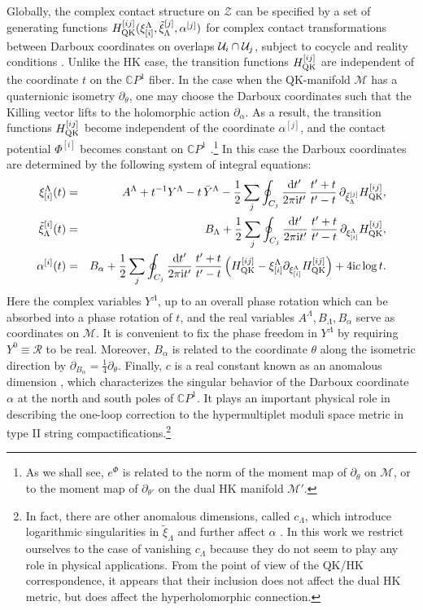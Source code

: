 \documentclass[12pt,reqno]{article}
\numberwithin{equation}{section}
\newcommand{\beq}{\begin{eqnarray}}
\newcommand{\eeq}{\end{eqnarray}}
\def\({\left(}
\def\){\right)}
\def\p{\partial}
\def\bY{ \bar Y }
\def\hcU{{\cal U}}
\newcommand{\CP}{\IC P^1}
\newcommand{\de}{\mathrm{d}}
\newcommand{\I}{\mathrm{i}}
\newcommand{\half}{\frac{1}{2}}
\newcommand{\cM}{\mathcal{M}}
\newcommand{\cR}{\mathcal{R}}
\newcommand{\cZ}{\mathcal{Z}}
\newcommand{\IC}{\mathbb{C}}
\def\qHij#1{H^{[#1]}_{\rm QK}}
\def\xii#1{\xi_{[#1]}}
\def\txii#1{{\tilde\xi}^{[#1]}}
\def\ai#1{{\alpha}^{[#1]}}
\def\ui#1{^{[#1]}}
\def\pa{\partial}
\newcommand{\txi}{\tilde\xi}
\def\varpiqk{t}
\def\sigp{{\theta}}
\def\phip{{\theta'}}
\def\pcM{\cM'}
\numberwithin{equation}{section}
\begin{document}
Globally, the complex contact structure on $\cZ$ can be specified by a set of generating
functions $\qHij{ij}(\xii{i}^\Lambda,\txii{j}_\Lambda,\ai{j})$ for complex contact transformations
between Darboux coordinates on overlaps
$\hcU_i\cap \hcU_j$,
subject to cocycle and reality conditions \cite{Alexandrov:2008nk}. Unlike the HK case,
the transition functions $\qHij{ij}$ are independent of the coordinate $\varpiqk$ on the
$\CP$ fiber.
In the case when the QK-manifold $\cM$ has a quaternionic isometry
$\partial_\sigp$, one may choose the Darboux coordinates such that the Killing
vector lifts to the holomorphic action $\pa_\alpha$. As a result, the
transition functions $\qHij{ij}$ become independent of the coordinate $\alpha\ui{j}$,
and the contact potential $\Phi^{[i]}$ becomes constant on
$\CP$ \cite{Alexandrov:2008gh}.\footnote{As we shall see, $e^\Phi$ is related to the
norm of the moment map of $\partial_\sigp$ on $\cM$, or to the moment map of
$\pa_\phip$ on the dual HK manifold $\pcM$.}
In this case the Darboux coordinates are determined by the following system of integral equations:
\beq
\xii{i}^\Lambda(\varpiqk)& =& A^\Lambda +
\varpiqk^{-1} Y^\Lambda - \varpiqk \, \bY^\Lambda
-\frac12 \sum_j \oint_{C_j}\frac{\de\varpiqk'}{2\pi\I \varpiqk'}\,
\frac{\varpiqk'+\varpiqk}{\varpiqk'-\varpiqk}
\,\p_{\txii{j}_\Lambda }\qHij{ij},
\nonumber \\
\txi_\Lambda^{[i]}(\varpiqk)& = &  B_\Lambda +
\half  \sum_j \oint_{C_j} \frac{\de \varpiqk'}{2 \pi \I \varpiqk'} \,
\frac{\varpiqk' + \varpiqk}{\varpiqk' - \varpiqk}
\, \p_{\xii{i}^\Lambda } \qHij{ij},
\label{txiqlineQK}
\\
\ai{i}(\varpiqk)& = & B_\alpha +
\half  \sum_j \oint_{C_j} \frac{\de \varpiqk'}{2 \pi \I \varpiqk'} \,
\frac{\varpiqk' + \varpiqk}{\varpiqk' - \varpiqk}
\( \qHij{ij}- \xii{i}^\Lambda \p_{\xii{i}^\Lambda}\qHij{ij}\)
+4\I c \log\varpiqk .
\nonumber
\eeq
Here the complex variables $Y^\Lambda$, up to an overall phase rotation
which can be absorbed into a phase rotation of $\varpiqk$,
and the real variables $A^\Lambda,B_\Lambda,B_\alpha$
serve as coordinates on $\cM$. It is convenient to fix the phase freedom in  $Y^\Lambda$
by requiring $Y^0\equiv \cR$ to be real.
Moreover, $B_\alpha$ is related to the coordinate $\sigp$ along the isometric direction
by $\pa_{B_\alpha}=\frac14 \pa_\sigp$. Finally,
$c$ is a real constant known as an anomalous dimension \cite{Alexandrov:2008nk},
which characterizes the singular behavior of the Darboux coordinate $\alpha$
at the north and south poles of $\CP$. It plays an important physical role in describing
 the one-loop correction to the hypermultiplet moduli space metric in type II
 string compactifications.\footnote{In fact, there are
 other anomalous dimensions, called $c_\Lambda$,
which introduce logarithmic singularities in $\txi_\Lambda$ and further affect $\alpha$ \cite{Alexandrov:2008nk}.
In this work we restrict ourselves to the case of vanishing $c_\Lambda$ because they do not seem to play
any role in physical applications. From the point of view of the QK/HK correspondence, it appears
that their inclusion does not affect the dual HK metric,
but does affect the hyperholomorphic connection.}
\end{document}
